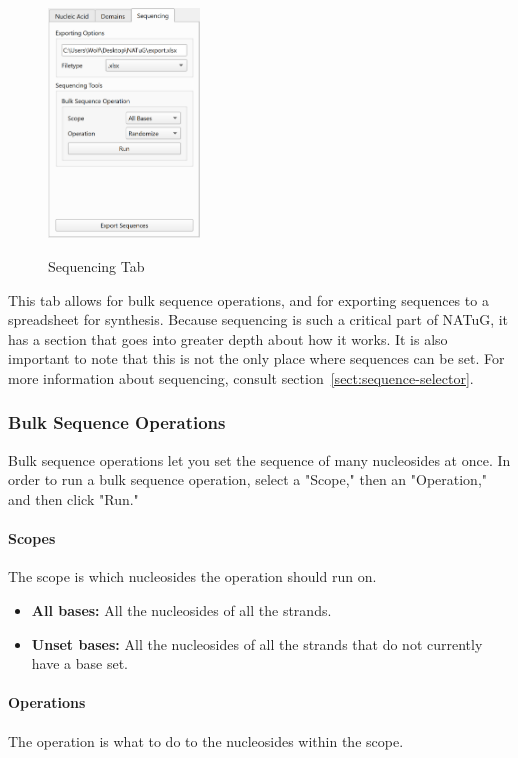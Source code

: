 \documentclass[
titlepage,
fontsize=12pt
]{article}
\begin{document}
	\begin{figure}
		\centering
		\caption{Sequencing Tab}
		\includegraphics[height=2.4in]{sequencing-tab.png}
		\label{fig:sequencing-tab}
	\end{figure}
	
	This tab allows for bulk sequence operations, and for exporting sequences to a spreadsheet for synthesis. Because sequencing is such a critical part of NATuG, it has a section that goes into greater depth about how it works. It is also important to note that this is not the only place where sequences can be set. For more information about sequencing, consult section~\ref{sect:sequence-selector}.
	
	\subsubsection{Bulk Sequence Operations}
	Bulk sequence operations let you set the sequence of many nucleosides at once. In order to run a bulk sequence operation, select a "Scope," then an "Operation," and then click "Run."
	
	\paragraph{Scopes}
	The scope is which nucleosides the operation should run on.
	
	\begin{itemize}
		\item \textbf{All bases:} All the nucleosides of all the strands.
		\item \textbf{Unset bases:} All the nucleosides of all the strands that do not currently have a base set.
	\end{itemize}

	\paragraph{Operations}
	The operation is what to do to the nucleosides within the scope.
	
\end{document}
